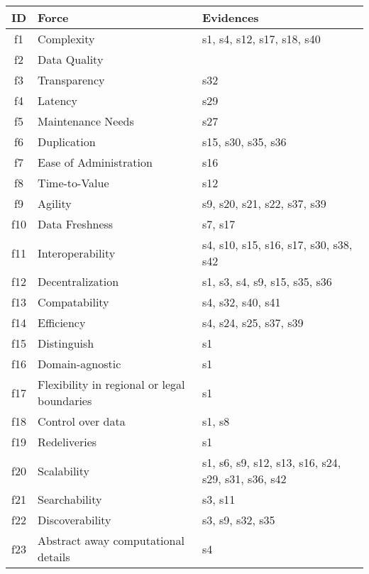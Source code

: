 \begin{tabular}{|c|p{}|p{}|}
\hline
{\bf ID} & {\bf Force} & {\bf Evidences}\\
\hline
f1 & Complexity & \cellcolor{emerald_shape_3} {s1, s4, s12, s17, s18, s40}\\
f2 & Data Quality & \cellcolor{emerald_shape_1} {}\\
f3 & Transparency & \cellcolor{emerald_shape_1} {s32}\\
f4 & Latency & \cellcolor{emerald_shape_1} {s29}\\
f5 & Maintenance Needs & \cellcolor{emerald_shape_1} {s27}\\
f6 & Duplication & \cellcolor{emerald_shape_2} {s15, s30, s35, s36}\\
f7 & Ease of Administration & \cellcolor{emerald_shape_1} {s16}\\
f8 & Time-to-Value & \cellcolor{emerald_shape_1} {s12}\\
f9 & Agility & \cellcolor{emerald_shape_3} {s9, s20, s21, s22, s37, s39}\\
f10 & Data Freshness & \cellcolor{emerald_shape_1} {s7, s17}\\
f11 & Interoperability & \cellcolor{emerald_shape_3} {s4, s10, s15, s16, s17, s30, s38, s42}\\
f12 & Decentralization & \cellcolor{emerald_shape_3} {s1, s3, s4, s9, s15, s35, s36}\\
f13 & Compatability & \cellcolor{emerald_shape_2} {s4, s32, s40, s41}\\
f14 & Efficiency & \cellcolor{emerald_shape_3} {s4, s24, s25, s37, s39}\\
f15 & Distinguish & \cellcolor{emerald_shape_1} {s1}\\
f16 & Domain-agnostic & \cellcolor{emerald_shape_1} {s1}\\
f17 & Flexibility in regional or legal boundaries & \cellcolor{emerald_shape_1} {s1}\\
f18 & Control over data & \cellcolor{emerald_shape_1} {s1, s8}\\
f19 & Redeliveries & \cellcolor{emerald_shape_1} {s1}\\
f20 & Scalability & \cellcolor{emerald_shape_4} {s1, s6, s9, s12, s13, s16, s24, s29, s31, s36, s42}\\
f21 & Searchability & \cellcolor{emerald_shape_1} {s3, s11}\\
f22 & Discoverability & \cellcolor{emerald_shape_2} {s3, s9, s32, s35}\\
f23 & Abstract away computational details & \cellcolor{emerald_shape_1} {s4}\\

\end{tabular}

